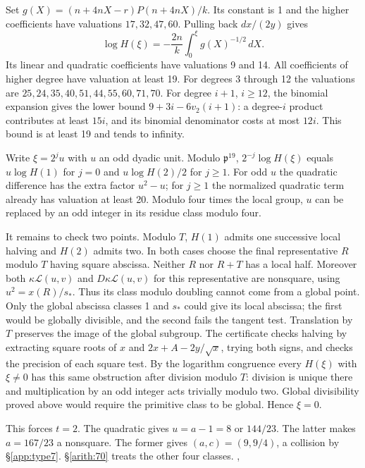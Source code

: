Set \(g(X)=(n+4nX-r)P(n+4nX)/k\). Its constant is 1 and the higher
coefficients have valuations \(17,32,47,60\). Pulling back
\(dx/(2y)\) gives
\[\log H(\xi)=-\frac{2n}{k}\int_0^\xi g(X)^{-1/2}\,dX .\]
Its linear and quadratic coefficients have valuations 9 and 14.
All coefficients of higher degree have valuation at least 19. For
degrees 3 through 12 the valuations are
\(25,24,35,40,51,44,55,60,71,70\). For degree \(i+1\), \(i\ge12\),
the binomial expansion gives the lower bound \(9+3i-6v_2(i+1)\):
a degree-\(i\) product contributes at least \(15i\), and its binomial
denominator costs at most \(12i\). This bound is at least 19 and tends
to infinity.

Write \(\xi=2^j u\) with \(u\) an odd dyadic unit. Modulo
\(\mathfrak p^{19}\), \(2^{-j}\log H(\xi)\) equals
\(u\log H(1)\) for \(j=0\) and \(u\log H(2)/2\) for \(j\ge1\).
For odd \(u\) the quadratic difference has the extra factor \(u^2-u\);
for \(j\ge1\) the normalized quadratic term already has valuation at
least 20. Modulo four times the local group, \(u\) can be replaced by
an odd integer in its residue class modulo four.

It remains to check two points. Modulo \(T\), \(H(1)\) admits one
successive local halving and \(H(2)\) admits two. In both cases choose
the final representative \(R\) modulo \(T\) having square abscissa.
Neither \(R\) nor \(R+T\) has a local half. Moreover both
\(\kappa\mathcal L(u,v)\) and \(D\kappa\mathcal L(u,v)\) for this
representative are nonsquare, using \(u^2=x(R)/s_*\). Thus its class
modulo doubling cannot come from a global point. Only the global
abscissa classes 1 and \(s_*\) could give its local abscissa;
the first would be globally divisible, and the second fails the
tangent test. Translation by \(T\) preserves the image of the global
subgroup. The certificate checks halving by extracting square roots
of \(x\) and \(2x+A-2y/\sqrt x\), trying both signs, and checks the
precision of each square test. By the logarithm congruence every
\(H(\xi)\) with \(\xi\ne0\) has this same obstruction after division
modulo \(T\): division is unique there and multiplication by an odd
integer acts trivially modulo two. Global divisibility proved above
would require the primitive class to be global. Hence \(\xi=0\).

This forces \(t=2\). The quadratic gives \(u=a-1=8\) or \(144/23\).
The latter makes \(a=167/23\) a nonsquare. The former gives
\((a,c)=(9,9/4)\), a collision by \S\ref{app:type7}. \S\ref{arith:70} treats the
other four classes.
,

